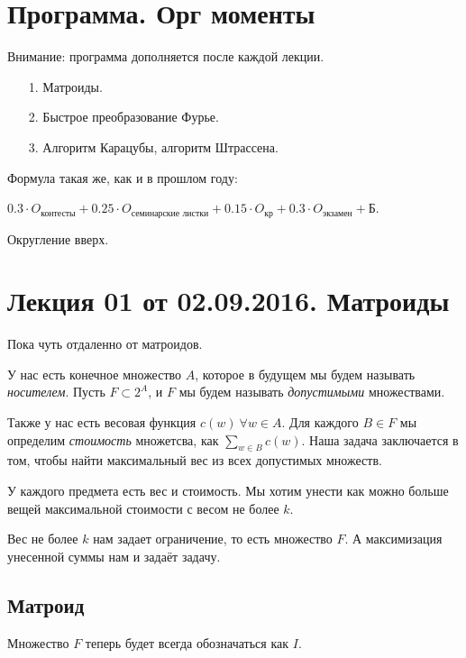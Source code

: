 \documentclass[a4paper, 12pt]{article}
\begin{document}
\pagestyle{fancy}

\section{Программа. Орг моменты}

Внимание: программа дополняется после каждой лекции.
\begin{itemize}
  \item[1.] Матроиды.
  \item[2.] Быстрое преобразование Фурье.
  \item[3.] Алгоритм Карацубы, алгоритм Штрассена.
\end{itemize}

Формула такая же, как и в прошлом году: 

$0.3\cdot O_{\text{контесты}} + 0.25
\cdot O_{\text{семинарские листки}} + 0.15 \cdot O_{\text{кр}} + 0.3\cdot 
O_{\text{экзамен}} + \text{Б}$.

 Округление вверх.

\section{Лекция 01 от 02.09.2016. Матроиды}

Пока чуть отдаленно от матроидов.

У нас есть конечное множество $A$, которое в будущем мы будем называть 
\textit{носителем}. Пусть $F \subset 2^{A}$, и $F$ мы будем называть 
\textit{допустимыми} множествами.

Также у нас есть весовая функция $c(w) \ \forall w \in A$. 
Для каждого $B \in F$ мы определим \textit{стоимость} 
множетсва, как $\sum\limits_{w \in B} c(w)$. Наша задача 
заключается в том, чтобы найти максимальный вес из всех допустимых множеств.

\begin{Examples}
У каждого предмета есть вес и стоимость. Мы хотим унести как можно больше 
вещей максимальной стоимости с весом не более $k$.

Вес не более $k$ нам задает ограничение, то есть множество $F$.
А максимизация унесенной суммы нам и задаёт задачу.
\end{Examples}

\subsection{Матроид}

Множество $F$ теперь будет всегда обозначаться как $I$.
\end{document}
